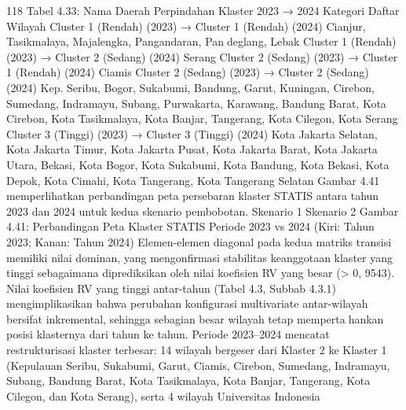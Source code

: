118
Tabel 4.33: Nama Daerah Perpindahan Klaster 2023 → 2024
Kategori Daftar Wilayah
Cluster 1 (Rendah)
(2023) → Cluster 1
(Rendah) (2024)
Cianjur, Tasikmalaya, Majalengka, Pangandaran, Pandeglang, Lebak
Cluster 1 (Rendah)
(2023) → Cluster 2
(Sedang) (2024)
Serang
Cluster 2 (Sedang)
(2023) → Cluster 1
(Rendah) (2024)
Ciamis
Cluster 2 (Sedang)
(2023) → Cluster 2
(Sedang) (2024)
Kep. Seribu, Bogor, Sukabumi, Bandung, Garut, Kuningan,
Cirebon, Sumedang, Indramayu, Subang, Purwakarta,
Karawang, Bandung Barat, Kota Cirebon, Kota Tasikmalaya,
Kota Banjar, Tangerang, Kota Cilegon, Kota Serang
Cluster 3 (Tinggi)
(2023) → Cluster 3
(Tinggi) (2024)
Kota Jakarta Selatan, Kota Jakarta Timur, Kota Jakarta Pusat,
Kota Jakarta Barat, Kota Jakarta Utara, Bekasi, Kota Bogor,
Kota Sukabumi, Kota Bandung, Kota Bekasi, Kota Depok,
Kota Cimahi, Kota Tangerang, Kota Tangerang Selatan
Gambar 4.41 memperlihatkan perbandingan peta persebaran klaster STATIS antara
tahun 2023 dan 2024 untuk kedua skenario pembobotan.
Skenario 1 Skenario 2
Gambar 4.41: Perbandingan Peta Klaster STATIS Periode 2023 vs 2024 (Kiri: Tahun
2023; Kanan: Tahun 2024)
Elemen-elemen diagonal pada kedua matriks transisi memiliki nilai dominan, yang
mengonfirmasi stabilitas keanggotaan klaster yang tinggi sebagaimana diprediksikan oleh
nilai koefisien RV yang besar (> 0, 9543). Nilai koefisien RV yang tinggi antar-tahun
(Tabel 4.3, Subbab 4.3.1) mengimplikasikan bahwa perubahan konfigurasi multivariate
antar-wilayah bersifat inkremental, sehingga sebagian besar wilayah tetap mempertahankan posisi klasternya dari tahun ke tahun. Periode 2023–2024 mencatat restrukturisasi
klaster terbesar: 14 wilayah bergeser dari Klaster 2 ke Klaster 1 (Kepulauan Seribu,
Sukabumi, Garut, Ciamis, Cirebon, Sumedang, Indramayu, Subang, Bandung Barat, Kota
Tasikmalaya, Kota Banjar, Tangerang, Kota Cilegon, dan Kota Serang), serta 4 wilayah
Universitas Indonesia


